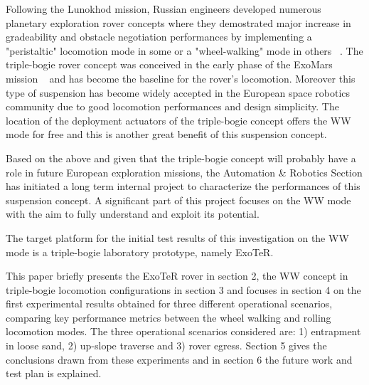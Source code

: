 \documentclass[a4paper,twocolumn]{esapub2005} %
\begin{document}
Following the Lunokhod mission, Russian engineers developed numerous planetary
exploration rover concepts where they demostrated major increase in
gradeability and obstacle negotiation performances by implementing a
"peristaltic" locomotion mode in some or a "wheel-walking" mode in others
~\cite{Ehrenfreund1998}. The triple-bogie rover concept was conceived in the
early phase of the ExoMars mission ~\cite{Patel2010} and has become the
baseline for the rover's locomotion. Moreover this type of suspension has
become widely accepted in the European space robotics community due to good
locomotion performances and design simplicity. The location of the deployment
actuators of the triple-bogie concept offers the WW mode for free and this is
another great benefit of this suspension concept.

Based on the above and given that the triple-bogie concept will probably have a
role in future European exploration missions, the Automation \& Robotics
Section has initiated a long term internal project to characterize the
performances of this suspension concept. A significant part of this project
focuses on the WW mode with the aim to fully understand and exploit its
potential.

The target platform for the initial test results of this investigation on the
WW mode is a triple-bogie laboratory prototype, namely ExoTeR. 

%

This paper briefly presents the ExoTeR rover in section 2, the WW
concept in triple-bogie locomotion configurations in section 3 and focuses in
section 4 on the first experimental results obtained for three different
operational scenarios, comparing key performance metrics between the wheel
walking and rolling locomotion modes. The three operational scenarios
considered are: 1) entrapment in loose sand, 2) up-slope traverse and 3) rover
egress. Section 5 gives the conclusions drawn from these experiments and in
section 6 the future work and test plan is explained.
\end{document}
